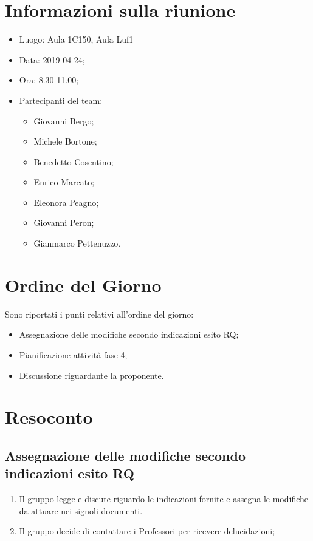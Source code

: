 \documentclass[11pt,a4paper]{article}
\begin{document}
	\section{Informazioni sulla riunione}
	\begin{itemize}
		\item Luogo: Aula 1C150, Aula Luf1
		\item Data: 2019-04-24;
		\item Ora: 8.30-11.00;
		\item Partecipanti del team:
			\begin{itemize}
				\item Giovanni Bergo;
				\item Michele Bortone;
				\item Benedetto Cosentino;
				\item Enrico Marcato;
				\item Eleonora Peagno;
				\item Giovanni Peron;
				\item Gianmarco Pettenuzzo.
				
			\end{itemize}
	\end{itemize}
	
	\section{Ordine del Giorno}
	Sono riportati i punti relativi all'ordine del giorno:
	\begin{itemize}
		\item Assegnazione delle modifiche secondo indicazioni esito RQ;
		\item Pianificazione attività fase 4;
		\item Discussione riguardante la proponente.
	\end{itemize}
	
	\section{Resoconto}
	\subsection{Assegnazione delle modifiche secondo indicazioni esito RQ}
	\begin{enumerate}
	\item Il gruppo legge e discute riguardo le indicazioni fornite e assegna le modifiche da attuare nei signoli documenti.
	\item Il gruppo decide di contattare i Professori per ricevere delucidazioni;
	\end{enumerate}
\end{document}
